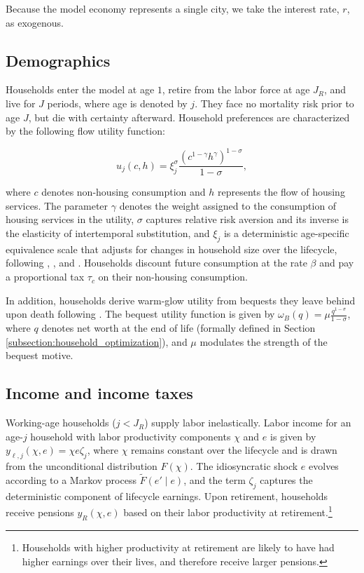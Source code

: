 \documentclass[parskip=full]{article}
\begin{document}
Because the model economy represents a single city, we take the interest rate, $r$, as exogenous. 

\subsection{Demographics}\label{subsection:demographics}

Households enter the model at age $1$, retire from the labor force at age $J_{R}$, and live for $J$ periods, where age is denoted by $j$. They face no mortality risk prior to age $J$, but die with certainty afterward. Household preferences are characterized by the following flow utility function:

\begin{equation*}
    u_{j}(c,h)=\xi_{j}^{\sigma}\frac{\left(c^{1-\gamma} h^{\gamma}\right)^{1-\sigma}}{1-\sigma},
\end{equation*}

\noindent where $c$ denotes non-housing consumption and $h$ represents the flow of housing services. The parameter $\gamma$ denotes the weight assigned to the consumption of housing services in the utility, $\sigma$ captures relative risk aversion and its inverse is the elasticity of intertemporal substitution, and $\xi_{j}$ is a deterministic age-specific equivalence scale that adjusts for changes in household size over the lifecycle, following \citet{lm-1980}, \citet{wz-2010}, and \citet{xu-2013}. Households discount future consumption at the rate $\beta$ and pay a proportional tax $\tau_{c}$ on their non-housing consumption.

In addition, households derive warm-glow utility from bequests they leave behind upon death following \citet{cagetti-denardi-2006}. The bequest utility function is given by $\omega_{B}(q)=\mu \frac{q^{1-\sigma}}{1-\sigma}$, where $q$ denotes net worth at the end of life (formally defined in Section \ref{subsection:household_optimization}), and $\mu$ modulates the strength of the bequest motive.

\subsection{Income and income taxes}\label{subsection:income}

Working-age households ($j<J_{R}$) supply labor inelastically. Labor income for an age-$j$ household with labor productivity components $\chi$ and $e$ is given by $y_{\ell,j}(\chi,e)=\chi e\zeta_j$, where $\chi$ remains constant over the lifecycle and is drawn from the unconditional distribution $\hat{F}(\chi)$. The idiosyncratic shock $e$ evolves according to a Markov process $\tilde{F}(e' \mid e)$, and the term $\zeta_j$ captures the deterministic component of lifecycle earnings. Upon retirement, households receive pensions $y_{R}(\chi,e)$ based on their labor productivity at retirement.\footnote{Households with higher productivity at retirement are likely to have had higher earnings over their lives, and therefore receive larger pensions.}
\end{document}
